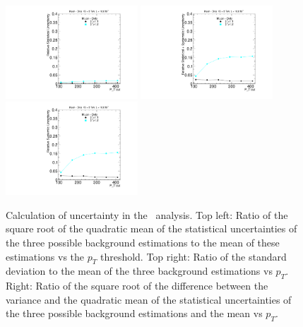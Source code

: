 \begin{figure}
\begin{center}
\includegraphics[clip=true, trim=0.0cm 0cm 3.0cm 0cm,width=0.44\textwidth]{figures/muonly/Data8TeVCollisionStat}
\includegraphics[clip=true, trim=0.0cm 0cm 3.0cm 0cm,width=0.44\textwidth]{figures/muonly/Data8TeVCollisionStatSyst} \\
\includegraphics[clip=true, trim=0.0cm 0cm 3.0cm 0cm,width=0.44\textwidth]{figures/muonly/Data8TeVCollisionSyst}
\caption[Statistical and systematic uncertainties in the background prediction for different sets of thresholds in the \muononly\ analysis.]
{Calculation of uncertainty in the \muononly\ analysis.
Top left: Ratio of the square root of the quadratic
mean of the statistical uncertainties of the three possible background
estimations to the mean of these estimations vs
the $p_T$ threshold. Top right: Ratio of the standard deviation to the mean of the three
background estimations vs $p_T$. Right: Ratio of the
square root of the difference between the variance and the quadratic
mean of the statistical uncertainties  of the three possible background
estimations and the mean vs $p_T$.
}
\label{fig:MuOnlyUnc}
\end{center}
\end{figure}

